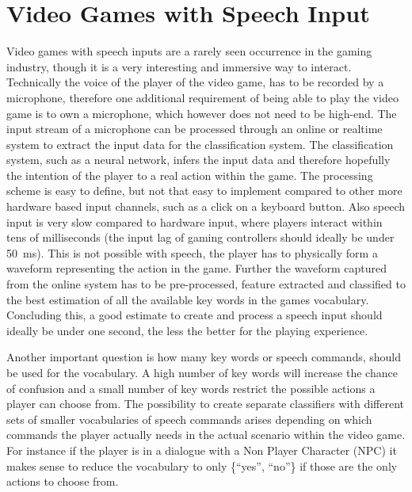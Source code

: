 
\section{Video Games with Speech Input}\label{sec:intro_games}
\thesisStateReady
Video games with speech inputs are a rarely seen occurrence in the gaming industry, though it is a very interesting and immersive way to interact.
Technically the voice of the player of the video game, has to be recorded by a microphone, therefore one additional requirement of being able to play the video game is to own a microphone, which however does not need to be high-end.
The input stream of a microphone can be processed through an online or realtime system to extract the input data for the classification system.
The classification system, such as a neural network, infers the input data and therefore hopefully the intention of the player to a real action within the game.
The processing scheme is easy to define, but not that easy to implement compared to other more hardware based input channels, such as a click on a keyboard button.
Also speech input is very slow compared to hardware input, where players interact within tens of milliseconds (the input lag of gaming controllers should ideally be under \SI{50}{\milli\second}).
This is not possible with speech, the player has to physically form a waveform representing the action in the game.
Further the waveform captured from the online system has to be pre-processed, feature extracted and classified to the best estimation of all the available key words in the games vocabulary.
Concluding this, a good estimate to create and process a speech input should ideally be under one second, the less the better for the playing experience.

Another important question is how many key words or speech commands, should be used for the vocabulary.
A high number of key words will increase the chance of confusion and a small number of key words restrict the possible actions a player can choose from.
The possibility to create separate classifiers with different sets of smaller vocabularies of speech commands arises depending on which commands the player actually needs in the actual scenario within the video game. For instance if the player is in a dialogue with a Non Player Character (NPC) it makes sense to reduce the vocabulary to only \{\enquote{yes}, \enquote{no}\} if those are the only actions to choose from.

